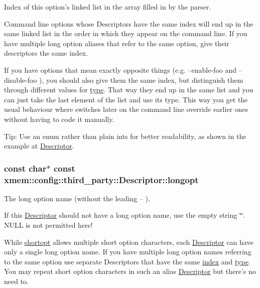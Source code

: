 Index of this option's linked list in the array filled in by the parser. 

Command line options whose Descriptors have the same index will end up in the same linked list in the order in which they appear on the command line. If you have multiple long option aliases that refer to the same option, give their descriptors the same {\ttfamily index}.

If you have options that mean exactly opposite things (e.\-g. {\ttfamily --enable-\/foo} and {\ttfamily --disable-\/foo} ), you should also give them the same {\ttfamily index}, but distinguish them through different values for \hyperlink{structxmem_1_1config_1_1third__party_1_1_descriptor_a4b9e9a5c9b08ef575ea4f603c54bff63}{type}. That way they end up in the same list and you can just take the last element of the list and use its type. This way you get the usual behaviour where switches later on the command line override earlier ones without having to code it manually.

\begin{DoxyParagraph}{Tip\-:}
Use an enum rather than plain ints for better readability, as shown in the example at \hyperlink{structxmem_1_1config_1_1third__party_1_1_descriptor}{Descriptor}. 
\end{DoxyParagraph}
\hypertarget{structxmem_1_1config_1_1third__party_1_1_descriptor_a7246a4bfc669f68bb406dece398be7bb}{
\subsubsection[{longopt}]{\setlength{\rightskip}{0pt plus 5cm}const char$\ast$ const xmem\-::config\-::third\-\_\-party\-::\-Descriptor\-::longopt}}\label{structxmem_1_1config_1_1third__party_1_1_descriptor_a7246a4bfc669f68bb406dece398be7bb}


The long option name (without the leading {\ttfamily --} ). 

If this \hyperlink{structxmem_1_1config_1_1third__party_1_1_descriptor}{Descriptor} should not have a long option name, use the empty string \char`\"{}\char`\"{}. N\-U\-L\-L is not permitted here!

While \hyperlink{structxmem_1_1config_1_1third__party_1_1_descriptor_ac2dfb6bb8ca2f4aabf964a910cf0d59b}{shortopt} allows multiple short option characters, each \hyperlink{structxmem_1_1config_1_1third__party_1_1_descriptor}{Descriptor} can have only a single long option name. If you have multiple long option names referring to the same option use separate Descriptors that have the same \hyperlink{structxmem_1_1config_1_1third__party_1_1_descriptor_aacf3d44f35c61f22be65da078f60734b}{index} and \hyperlink{structxmem_1_1config_1_1third__party_1_1_descriptor_a4b9e9a5c9b08ef575ea4f603c54bff63}{type}. You may repeat short option characters in such an alias \hyperlink{structxmem_1_1config_1_1third__party_1_1_descriptor}{Descriptor} but there's no need to.

